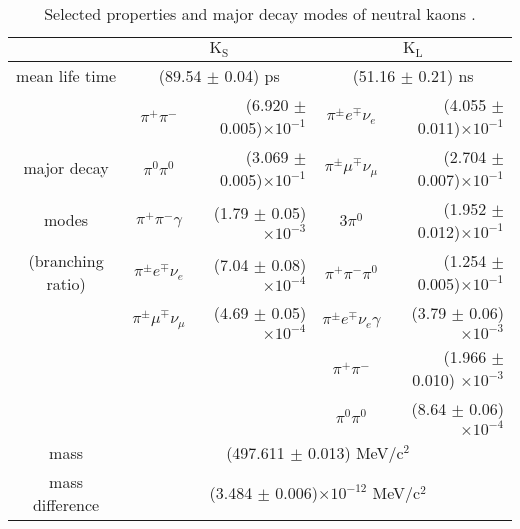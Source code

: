 \begin{table}[h!]
  \small
  \centering
  \caption{Selected properties and major decay modes of neutral kaons \cite{pdg2016}.}\label{tab:kaon_properties}
  \begin{tabular}{ccrcr}
  \toprule
  {}                &         \multicolumn{2}{c}{  $\mathrm{K_S}$} & \multicolumn{2}{c}{ $\mathrm{K_L}$}   \\
  \midrule
  mean life time    & \multicolumn{2}{c}{(89.54 $\pm$ 0.04) ps} & \multicolumn{2}{c}{(51.16 $\pm$ 0.21) ns} \\
  \midrule
                  &	     $\pi^+\pi^-$ & (6.920 $\pm$ 0.005)$\times 10^{-1}$  &    $\pi^\pm e^{\mp} \nu_e$ & (4.055 $\pm$ 0.011)$\times 10^{-1}$ \\      	      
major decay &	     $\pi^0\pi^0$ & (3.069 $\pm$ 0.005)$\times 10^{-1}$	&    $\pi^\pm \mu^{\mp} \nu_{\mu}$ & (2.704 $\pm$ 0.007)$\times 10^{-1}$ \\      	   
modes  &	     $\pi^+\pi^-\gamma$ & (1.79 $\pm$ 0.05) $\times 10^{-3}$		 &   	    3$\pi^0$ & (1.952 $\pm$ 0.012)$\times 10^{-1}$   \\
 (branching ratio)  &	     $\pi^{\pm} e^{\mp} \nu_e$ & (7.04 $\pm$ 0.08) $\times  10^{-4}$	   	 &	    $\pi^+\pi^-\pi^0$ & (1.254 $\pm$ 0.005)$\times 10^{-1}$  \\
  &	          $\pi^{\pm} \mu^{\mp} \nu_{\mu}$ & (4.69 $\pm$ 0.05) $\times  10^{-4}$          &	$\pi^{\pm}e^{\mp}\nu_e\gamma$ & (3.79 $\pm$ 0.06) $\times 10^{-3}$ \\
&  \multicolumn{2}{c}{} &  $\pi^+\pi^-$ & (1.966 $\pm$ 0.010) $\times 10^{-3}$	 \\
                    & \multicolumn{2}{c}{}  &  $\pi^0\pi^0$ & (8.64 $\pm$ 0.06) $\times 10^{-4}$       \\
    \midrule
mass              &	     \multicolumn{4}{c}{ (497.611 $\pm$ 0.013) MeV/$\mathrm{c^2}$ } \\ 
  mass difference   &          \multicolumn{4}{c}{ (3.484 $\pm$ 0.006)$\times 10^{-12}$ MeV/$\mathrm{c^2}$ } \\
  \bottomrule
\end{tabular}
\end{table}

